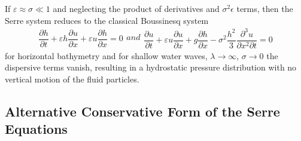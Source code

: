\documentclass[preprint,sort&compress,1p]{article}
\begin{document}
If $\varepsilon \approx \sigma \ll 1$ and neglecting the product of derivatives and $\sigma^2\epsilon$ terms, then the Serre system reduces to the classical Boussinesq system
\begin{subequations}
\label{eq:Boussinesq_nondimensional}
\begin{gather}
\dfrac{\partial h}{\partial t} + \varepsilon h \dfrac{\partial u}{\partial x} + \varepsilon u \dfrac{\partial h}{\partial x} = 0
\end{gather}
and
\begin{gather}
\dfrac{\partial u}{\partial t} + \varepsilon u \dfrac{\partial u}{\partial x} + g \dfrac{\partial h}{\partial x} - \sigma^2 \dfrac{h^2}{3} \dfrac{\partial^3 u}{\partial x^2 \partial t} = 0
\end{gather}
\end{subequations}
for horizontal bathymetry and for shallow water waves, $\lambda \rightarrow \infty$, $\sigma \rightarrow 0$ the dispersive terms vanish, resulting in a hydrostatic pressure distribution with no vertical motion of the fluid particles.

\subsection{Alternative Conservative Form of the Serre Equations}
\end{document}
